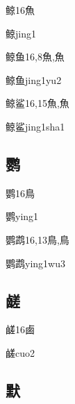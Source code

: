 \begin{Entry}{鲸}{16}{⿂}
  \begin{Phonetics}{鲸}{jing1}
  \end{Phonetics}
\end{Entry}

\begin{Entry}{鲸鱼}{16,8}{⿂,⿂}
  \begin{Phonetics}{鲸鱼}{jing1yu2}
  \end{Phonetics}
\end{Entry}

\begin{Entry}{鲸鲨}{16,15}{⿂,⿂}
  \begin{Phonetics}{鲸鲨}{jing1sha1}
  \end{Phonetics}
\end{Entry}

\subsection*{鹦}

\begin{Entry}{鹦}{16}{⿃}
  \begin{Phonetics}{鹦}{ying1}
  \end{Phonetics}
\end{Entry}

\begin{Entry}{鹦鹉}{16,13}{⿃,⿃}
  \begin{Phonetics}{鹦鹉}{ying1wu3}
  \end{Phonetics}
\end{Entry}

\subsection*{鹾}

\begin{Entry}{鹾}{16}{⿄}
  \begin{Phonetics}{鹾}{cuo2}
  \end{Phonetics}
\end{Entry}

\subsection*{默}

